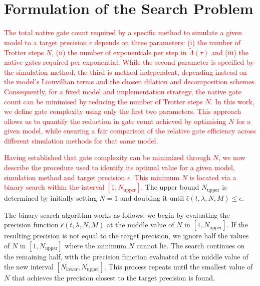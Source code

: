\documentclass[pdflatex,sn-mathphys-num]{sn-jnl}%
\begin{document}
\section{Formulation of the Search Problem}\label{sec_binary_search}

\textcolor{red}{The total native gate count required by a specific method to simulate a given model to a target precision $\epsilon$ depends on three parameters: (i) the number of Trotter steps $N$, (ii) the number of exponentials per step in $\tilde{\Lambda}(\tau)$ and (iii) the native gates required per exponential. While the second parameter is specified by the simulation method, the third is method-independent, depending instead on the model's Liouvillian terms and the chosen dilation and decomposition schemes. Consequently, for a fixed model and implementation strategy, the native gate count can be minimised by reducing the number of Trotter steps $N$. In this work, we define gate complexity using only the first two parameters. This approach allows us to quantify the reduction in gate count achieved by optimising $N$ for a given model, while ensuring a fair comparison of the relative gate efficiency across different simulation methods for that same model.}

\textcolor{red}{Having established that gate complexity can be minimized through $N$, we now describe the procedure used to identify its optimal value for a given model, simulation method and target precision $\epsilon$. This minimum $N$ is located via a binary search \cite{knuth1997art} within the interval $[1, N_{\mathrm{upper}}]$.} The upper bound $N_{\mathrm{upper}}$ is determined by initially setting $N = 1$ and doubling it until $\hat\epsilon(t, \lambda, N, M) \leq \epsilon$.

The binary search algorithm works as follows: we begin by evaluating the precision function $\hat\epsilon(t,\lambda,N,M)$ at the middle value of $N$ in $[1,N_{\mathrm{upper}}]$. If the resulting precision is not equal to the target precision, we ignore half the values of $N$ in $[1,N_{\mathrm{upper}}]$ where the minimum $N$ cannot lie. The search continues on the remaining half, with the precision function evaluated at the middle value of the new interval $[N_{\mathrm{lower}}, N_{\mathrm{upper}}]$. This process repeats until the smallest value of $N$ that achieves the precision closest to the target precision is found.
\end{document}
